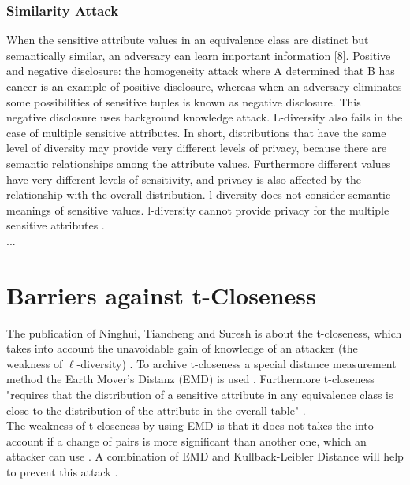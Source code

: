 \documentclass{llncs}
\begin{document}
\subsubsection{Similarity Attack} 
When the sensitive attribute values in an equivalence class are distinct but semantically similar, an adversary can learn important information [8]. Positive and negative disclosure: the homogeneity attack where A determined that B has cancer is an example of positive disclosure, whereas when an adversary eliminates some possibilities of sensitive tuples is known as negative disclosure. This negative disclosure uses background knowledge attack. L-diversity also fails in the case of multiple sensitive attributes. In short, distributions that have the same level of diversity may provide very different levels of privacy, because there are semantic relationships among the attribute values. Furthermore different values have very different levels of sensitivity, and  privacy is also affected by the relationship with the overall distribution. l-diversity does not consider semantic meanings of sensitive values. l-diversity cannot provide privacy for the multiple sensitive attributes \cite{ldiversity}.
\\...
\section{Barriers against t-Closeness}
The publication of Ninghui, Tiancheng and Suresh is about the t-closeness, which takes into account the unavoidable gain of knowledge of an attacker (the weakness of $\ell$-diversity) \cite{li2007t}. To archive t-closeness a special distance measurement method the Earth Mover's Distanz (EMD) is used \cite{rubner2000earth}. Furthermore t-closeness "requires that the distribution of a sensitive attribute in any equivalence class is close to the distribution of the attribute in the overall table" \cite{li2007t}.\\
 
The weakness of t-closeness by using EMD is that it does not takes the into account if a change of pairs is more significant than another one, which an attacker can use \cite{li2007t}. A combination of EMD and Kullback-Leibler Distance \cite{kullback1951} will help to prevent this attack \cite{li2007t}.
\\
\end{document}
